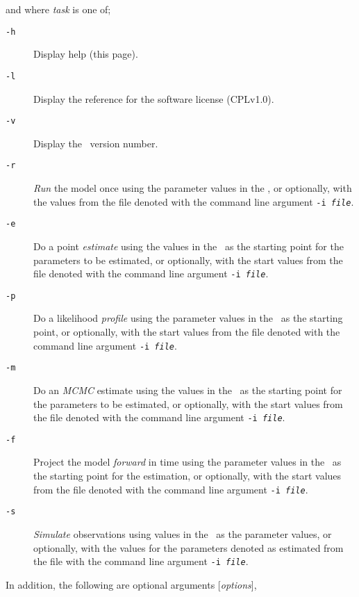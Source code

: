 and where \emph{task} is one of;
\begin{description}
\item [\texttt{-h}]  Display help (this page).
\item [\texttt{-l}] Display the reference for the software license (CPLv1.0).
\item [\texttt{-v}] Display the \SPM\ version number.

\item [\texttt{-r}] \emph{Run} the model once using the parameter values in the \config, or optionally, with the values from the file denoted with the command line argument \texttt{-i \emph{file}}.

\item [\texttt{-e}] Do a point \emph{estimate} using the values in the \config\ as the starting point for the parameters to be estimated, or optionally, with the start values from the file denoted with the command line argument \texttt{-i \emph{file}}.

\item [\texttt{-p}] Do a likelihood \emph{profile} using the parameter values in the \config\ as the starting point, or optionally, with the start values from the file denoted with the command line argument \texttt{-i \emph{file}}.

\item [\texttt{-m}] Do an \emph{MCMC} estimate using the values in the \config\ as the starting point for the parameters to be estimated, or optionally, with the start values from the file denoted with the command line argument \texttt{-i \emph{file}}.

\item [\texttt{-f}] Project the model \emph{forward} in time using the parameter values in the \config\ as the starting point for the estimation, or optionally, with the start values from the file denoted with the command line argument \texttt{-i \emph{file}}.

\item [\texttt{-s}] \emph{Simulate} observations using values in the \config\ as the parameter values, or optionally, with the values for the parameters denoted as estimated from the file with the command line argument \texttt{-i \emph{file}}.

\end{description}

In addition, the following are optional arguments [\emph{options}],

